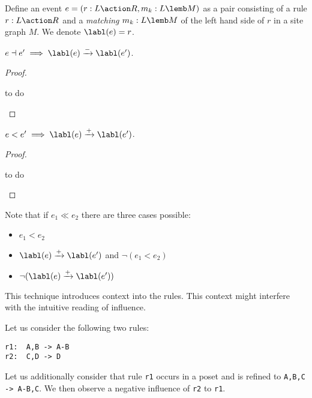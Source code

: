 \begin{definition}[Event]
  Define an event $e=(r:L\action R,m_k:L\lemb M)$ as a pair consisting of a rule $r:L\action R$ and a \emph{matching} $m_k:L\lemb M$ of the left hand side of $r$ in a site graph $M$. We denote $\labl(e) = r$.
\end{definition}

\begin{property}
  $e\dashv e' \implies\labl(e)\xrightarrow{-}\labl(e')$.
\end{property}
\begin{proof}
  \begin{mdframed}[backgroundcolor=blue!20]
    to do
  \end{mdframed}
\end{proof}

\begin{property}
\label{prop:cause_pos_infl}
  $e< e'\implies \labl(e)\xrightarrow{+}\labl(e')$.
\end{property}
\begin{proof}
  \begin{mdframed}[backgroundcolor=blue!20]
    to do
  \end{mdframed}
\end{proof}

Note that if $e_1\ll e_2$ there are three cases possible:
\begin{itemize}
\item $e_1< e_2$
\item $\labl(e)\xrightarrow{+}\labl(e')$ and $\neg(e_1 < e_2)$
\item $\neg(\labl(e)\xrightarrow{+}\labl(e'))$
\end{itemize}

This technique introduces context into the rules. This context might interfere with the intuitive reading of influence.

\begin{example}
\label{ex:infl_refined}
Let us consider the following two rules:

\begin{verbatim}
r1:  A,B -> A-B
r2:  C,D -> D
\end{verbatim}

Let us additionally consider that rule \verb|r1| occurs in a poset and is refined to \verb|A,B,C -> A-B,C|. We then observe a negative influence of \verb|r2| to \verb|r1|.
\end{example}

